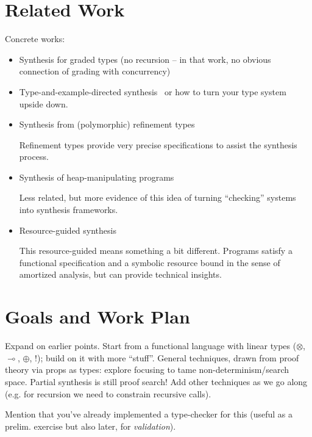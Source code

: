 \documentclass{llncs}
\newcommand{\lolli}{\multimap}
\newcommand{\tensor}{\otimes}
\newcommand{\bang}{{!}}
\begin{document}
\section{Related Work}

Concrete works:
\begin{itemize}
\item Synthesis for graded types (no recursion   -- in that work, no
  obvious connection of grading with
  concurrency)~\cite{DBLP:conf/lopstr/HughesO20}

\item Type-and-example-directed
  synthesis~\cite{DBLP:conf/pldi/OseraZ15,DBLP:conf/popl/FrankleOWZ16}
  or how to turn your type system upside down.
  
\item Synthesis from (polymorphic) refinement types~\cite{DBLP:conf/pldi/PolikarpovaKS16}

Refinement types provide very precise specifications to assist the
synthesis process.

\item Synthesis of heap-manipulating
  programs~\cite{DBLP:journals/pacmpl/PolikarpovaS19}

Less related, but more evidence of this idea of turning ``checking''
systems into synthesis frameworks.

\item Resource-guided synthesis \cite{DBLP:conf/pldi/KnothWP019}

This resource-guided means something a bit different. Programs satisfy
a functional specification and a symbolic resource bound in the sense
of amortized analysis, but can provide technical insights.

\end{itemize}

\section{Goals and Work Plan}



Expand on earlier points. Start from a functional language with linear
types ($\tensor$, $\lolli$, $\oplus$, $\bang$); build on it with more
``stuff''. General techniques, drawn from proof theory via props as
types: explore focusing to tame non-determinism/search space. Partial
synthesis is still proof search! Add other techniques as we go along
(e.g. for recursion we need to constrain recursive calls).

Mention that you've already implemented a type-checker for this
(useful as a prelim. exercise but also later, for \emph{validation}).
\end{document}
